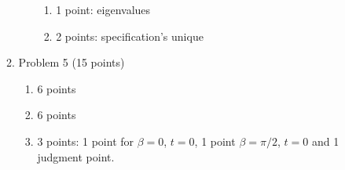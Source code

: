 \documentclass{article}
\begin{document}
\begin{enumerate}
\begin{enumerate}
\begin{enumerate}
\begin{enumerate}
                     \item 1 point: eigenvalues
                     \item 2 points: specification's unique
                  \end{enumerate}
            \end{enumerate}
         \item Problem 5 (15 points)
            \begin{enumerate}
               \item 6 points
               \item 6 points
               \item 3 points: 1 point for $ \beta = 0 $, $ t=0 $, 1 point $ \beta=
                  \pi/2 $, $ t=0 $ and 1 judgment point.
            \end{enumerate}
      \end{enumerate}
\end{enumerate}
\end{document}
